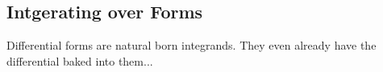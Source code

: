 \subsection{Intgerating over Forms}
Differential forms are natural born integrands. They even already have the differential baked into them...







